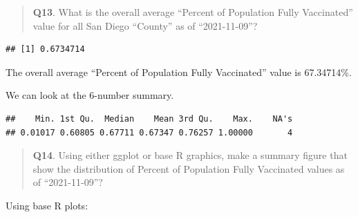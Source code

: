 \documentclass[
]{article}
\newenvironment{Shaded}{\begin{snugshade}}{\end{snugshade}}
\newcommand{\AttributeTok}[1]{\textcolor[rgb]{0.77,0.63,0.00}{#1}}
\newcommand{\ConstantTok}[1]{\textcolor[rgb]{0.00,0.00,0.00}{#1}}
\newcommand{\FloatTok}[1]{\textcolor[rgb]{0.00,0.00,0.81}{#1}}
\newcommand{\FunctionTok}[1]{\textcolor[rgb]{0.00,0.00,0.00}{#1}}
\newcommand{\NormalTok}[1]{#1}
\newcommand{\SpecialCharTok}[1]{\textcolor[rgb]{0.00,0.00,0.00}{#1}}
\newcommand{\StringTok}[1]{\textcolor[rgb]{0.31,0.60,0.02}{#1}}
\begin{document}
\begin{quote}
\textbf{Q13}. What is the overall average ``Percent of Population Fully
Vaccinated'' value for all San Diego ``County'' as of ``2021-11-09''?
\end{quote}

\begin{Shaded}
\end{Shaded}

\begin{verbatim}
## [1] 0.6734714
\end{verbatim}

The overall average ``Percent of Population Fully Vaccinated'' value is
67.34714\%.

We can look at the 6-number summary.

\begin{Shaded}
\end{Shaded}

\begin{verbatim}
##    Min. 1st Qu.  Median    Mean 3rd Qu.    Max.    NA's 
## 0.01017 0.60805 0.67711 0.67347 0.76257 1.00000       4
\end{verbatim}

\begin{quote}
\textbf{Q14}. Using either ggplot or base R graphics, make a summary
figure that show the distribution of Percent of Population Fully
Vaccinated values as of ``2021-11-09''?
\end{quote}

Using base R plots:

\begin{Shaded}
\end{Shaded}
\end{document}
